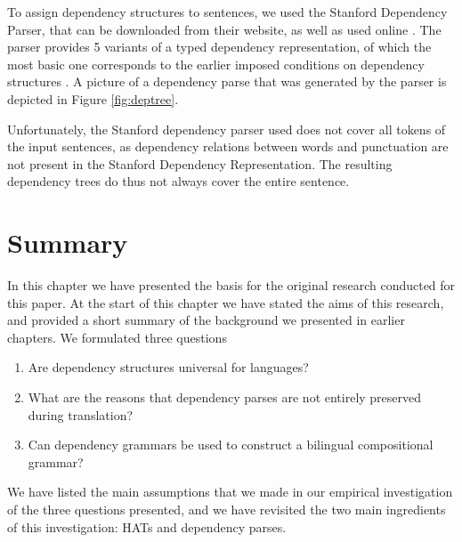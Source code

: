 To assign dependency structures to sentences, we used the Stanford Dependency Parser, that can be downloaded from their website, as well as used online  \citep{de2006generating}. The parser provides 5 variants of a typed dependency representation, of which the most basic one corresponds to the earlier imposed conditions on dependency structures \citep{de2008stanford}. A picture of a dependency parse that was generated by the parser is depicted in Figure \ref{fig:deptree}.

Unfortunately, the Stanford dependency parser used does not cover all tokens of the input sentences, as dependency relations between words and punctuation are not present in the Stanford Dependency Representation. The resulting dependency trees do thus not always cover the entire sentence.

\section{Summary}
\label{sec:summary4}

In this chapter we have presented the basis for the original research conducted for this paper. At the start of this chapter we have stated the aims of this research, and provided a short summary of the background we presented in earlier chapters. We formulated three questions\begin{enumerate}
\item Are dependency structures universal for languages?
\item What are the reasons that dependency parses are not entirely preserved during translation?
\item Can dependency grammars be used to construct a bilingual compositional grammar?
\end{enumerate}

We have listed the main assumptions that we made in our empirical investigation of the three questions presented, and we have revisited the two main ingredients of this investigation: HATs and dependency parses.
%
%